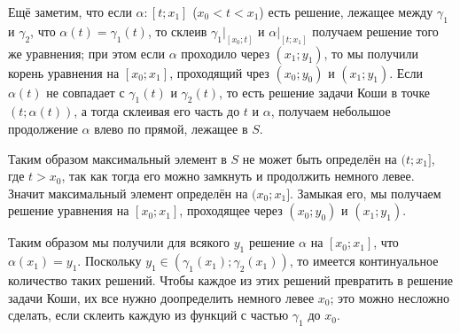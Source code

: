 \documentclass[12pt,a4paper]{article}
\begin{document}
\begin{problem}{4}
        Ещё заметим, что если $\alpha: [t; x_1]$ ($x_0 < t < x_1$) есть решение, лежащее между $\gamma_1$ и $\gamma_2$, что $\alpha(t) = \gamma_1(t)$, то склеив $\gamma_1|_{[x_0; t]}$ и $\alpha|_{[t; x_1]}$ получаем решение того же уравнения; при этом если $\alpha$ проходило через $(x_1; y_1)$, то мы получили корень уравнения на $[x_0; x_1]$, проходящий чрез $(x_0; y_0)$ и $(x_1; y_1)$. Если $\alpha(t)$ не совпадает с $\gamma_1(t)$ и $\gamma_2(t)$, то есть решение задачи Коши в точке $(t; \alpha(t))$, а тогда склеивая его часть до $t$ и $\alpha$, получаем небольшое продолжение $\alpha$ влево по прямой, лежащее в $S$.

        Таким образом максимальный элемент в $S$ не может быть определён на $(t; x_1]$, где $t > x_0$, так как тогда его можно замкнуть и продолжить немного левее. Значит максимальный элемент определён на $(x_0; x_1]$. Замыкая его, мы получаем решение уравнения на $[x_0; x_1]$, проходящее через $(x_0; y_0)$ и $(x_1; y_1)$.
        
        Таким образом мы получили для всякого $y_1$ решение $\alpha$ на $[x_0; x_1]$, что $\alpha(x_1) = y_1$. Поскольку $y_1 \in (\gamma_1(x_1); \gamma_2(x_1))$, то имеется континуальное количество таких решений. Чтобы каждое из этих решений превратить в решение задачи Коши, их все нужно доопределить немного левее $x_0$; это можно несложно сделать, если склеить каждую из функций с частью $\gamma_1$ до $x_0$.
    \end{problem}
\end{document}
